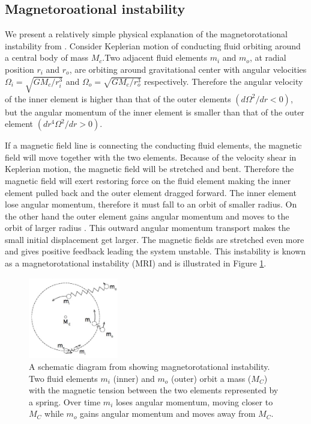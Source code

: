 \documentclass{jfm}
\begin{document}
%
%
\subsection{Magnetoroational instability}
We present a relatively simple physical explanation of the magnetorotational 
instability from \cite{Balbus2011}. Consider Keplerian motion of conducting 
fluid orbiting around a central body of mass $M_c$.Two adjacent fluid elements 
$m_i$ and $m_o$, at radial position $r_i$ and $r_o$, are orbiting around 
gravitational center with angular velocities $\Omega_i=\sqrt{GM_c / r_i^{3}}$ 
and $\Omega_o=\sqrt{GM_c / r_o^{3}}$ respectively. Therefore the angular 
velocity of the inner element is higher than that of the outer elements 
$\left(d \Omega^2 / dr < 0 \right)$, but the angular momentum of the inner 
element is smaller than that of the outer element 
$\left(d r^4\Omega^2 / dr > 0 \right)$.

If a magnetic field line is connecting the conducting fluid elements, the 
magnetic field will move together with the two elements. Because of the velocity
shear in Keplerian motion, the magnetic field will be stretched and bent. 
Therefore the magnetic field will exert restoring force on the fluid element 
making the inner element pulled back and the outer element dragged forward. 
The inner element lose angular momentum, therefore it must fall to an orbit of
smaller radius. On the other hand the outer element gains angular momentum and
moves to the orbit of larger radius \cite[see][]{Balbus2011,Wiki:MRI}. This 
outward angular momentum transport makes the small initial displacement get 
larger. The magnetic fields are stretched even more and gives positive feedback
leading the system unstable. This instability is known as a magnetorotational 
instability (MRI) and is illustrated in Figure \ref{fig:mri}.

\begin{figure}[t]
    \centering
    \includegraphics[width=0.35\textwidth]{Balbus2009_diagram}
        \caption{A schematic diagram from \cite{Balbus2011} showing magnetorotational instability. Two fluid elements $m_i$ (inner) and $m_o$ (outer) orbit a mass ($M_C$) with the magnetic tension between the two elements represented by a spring. Over time $m_i$ loses angular momentum, moving closer to $M_C$ while $m_o$ gains angular momentum and moves away from $M_C$.}
        \label{fig:mri}
\end{figure}
\end{document}
